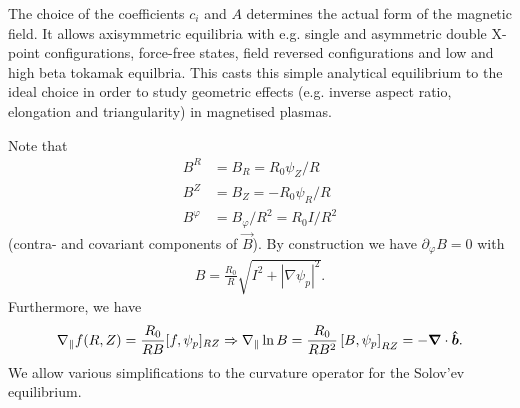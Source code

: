 The choice of the coefficients \(c_{i}\) and \(A\) determines the actual form of the magnetic field. It allows axisymmetric equilibria with e.g. single and asymmetric double X-point configurations, force-free states,
field reversed configurations and low and high beta tokamak equilbria. This casts this simple analytical equilibrium to the ideal choice in order to study geometric effects (e.g. inverse aspect ratio, elongation and triangularity) in magnetised plasmas.

Note that
\begin{align}
    B^R&=B_R = R_0\psi_Z/R \\
    B^Z&=B_Z = - R_0\psi_R/R \\
    B^\varphi &= B_\varphi/R^2 = R_0I/R^2
\end{align}
(contra- and covariant components of $\vec B$).
By construction we have $\partial_\varphi B = 0$ with
\begin{align}
  B = \frac{R_0}{R}\sqrt{ {I^2 + |\nabla \psi_p|^2}}.
    \label{}
\end{align}
Furthermore, we have
\begin{align}
  \nabla_\parallel f(R,Z) = \frac{R_0}{RB}[f,\psi_p]_{RZ}\Rightarrow \nabla_\parallel \ln B = \frac{R_0}{RB^2}\left[B, \psi_p\right]_{RZ} = -{\boldsymbol{\nabla}}\cdot\bm{\hat{b}}.
    \label{}
\end{align}
We allow various simplifications to the curvature operator
for the Solov'ev equilibrium.


